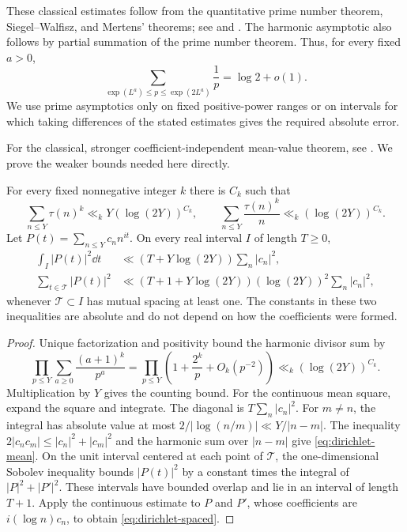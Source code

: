 These classical estimates follow from the quantitative prime number
theorem, Siegel--Walfisz, and Mertens' theorems; see
\cite[Corollary~39 and Exercises~40, 64]{TaoSW} and
\cite[Theorems~15, 26]{TaoMertens}. The harmonic asymptotic also follows
by partial summation of the prime number theorem. Thus, for every fixed $a>0$,
\begin{equation}\label{eq:band-mass}
 \sum_{\exp(L^a)\le p\le\exp(2L^a)}\frac1p
       =\log 2+o(1).
\end{equation}
We use prime asymptotics only on fixed positive-power ranges or on
intervals for which taking differences of the stated estimates gives
the required absolute error.

For the classical, stronger coefficient-independent mean-value
theorem, see \cite[Theorem~2 and Corollary~3]{MontgomeryVaughan1974}.
We prove the weaker bounds needed here directly.

\begin{lemma}
\label{lem:moment-bounds}
For every fixed nonnegative integer $k$ there is $C_k$ such that
\[
 \sum_{n\le Y}\tau(n)^k\ll_k Y(\log(2Y))^{C_k},\qquad
 \sum_{n\le Y}\frac{\tau(n)^k}{n}
       \ll_k(\log(2Y))^{C_k}.
\]
Let $P(t)=\sum_{n\le Y}c_n n^{it}$.  On every real interval $I$
of length $T\ge0$,
\begin{align}
 \int_I|P(t)|^2\dd t
 &\ll (T+Y\log(2Y))\sum_n|c_n|^2,\label{eq:dirichlet-mean}\\
 \sum_{t\in\mathcal T}|P(t)|^2
 &\ll (T+1+Y\log(2Y))(\log(2Y))^2
                  \sum_n|c_n|^2,\label{eq:dirichlet-spaced}
\end{align}
whenever $\mathcal T\subset I$ has mutual spacing at least one.
The constants in these two inequalities are absolute and do not
depend on how the coefficients were formed.
\end{lemma}

\begin{proof}
Unique factorization and positivity bound the harmonic divisor sum by
\[
 \prod_{p\le Y}\sum_{a\ge0}\frac{(a+1)^k}{p^a}
 =\prod_{p\le Y}\left(1+\frac{2^k}{p}+O_k(p^{-2})\right)
 \ll_k (\log(2Y))^{C_k}.
\]
Multiplication by $Y$ gives the counting bound. For the continuous
mean square, expand the square and integrate. The diagonal is
$T\sum_n|c_n|^2$. For $m\ne n$, the integral has absolute value at
most $2/|\log(n/m)|\ll Y/|n-m|$. The inequality
$2|c_nc_m|\le |c_n|^2+|c_m|^2$ and the harmonic sum over $|n-m|$
give \eqref{eq:dirichlet-mean}. On the unit interval centered at each
point of $\mathcal T$, the one-dimensional Sobolev inequality bounds
$|P(t)|^2$ by a constant times the integral of $|P|^2+|P'|^2$.
These intervals have bounded overlap and lie in an interval of length
$T+1$. Apply the continuous estimate to $P$ and $P'$, whose
coefficients are $i(\log n)c_n$, to obtain
\eqref{eq:dirichlet-spaced}.
\end{proof}

